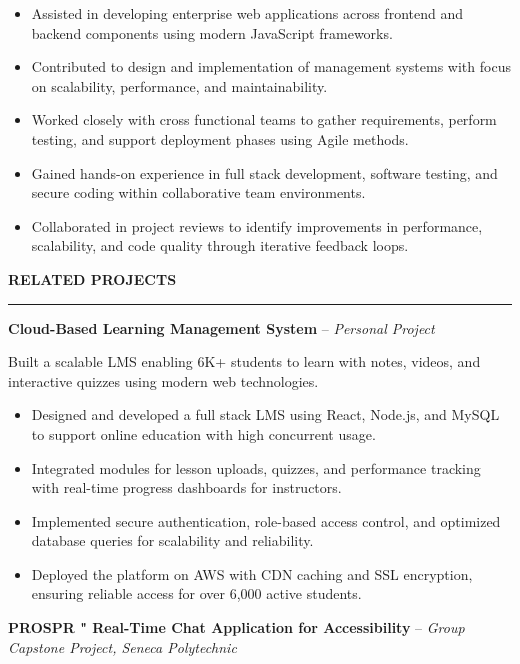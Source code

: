 \documentclass[10pt,letterpaper]{article}
\begin{document}
\begin{itemize}
\item Assisted in developing enterprise web applications across frontend and backend components using modern JavaScript frameworks.
\item Contributed to design and implementation of management systems with focus on scalability, performance, and maintainability.
\item Worked closely with cross functional teams to gather requirements, perform testing, and support deployment phases using Agile methods.
\item Gained hands-on experience in full stack development, software testing, and secure coding within collaborative team environments.
\item Collaborated in project reviews to identify improvements in performance, scalability, and code quality through iterative feedback loops.
\end{itemize}

\vspace{6pt}

\textbf{RELATED PROJECTS}\\[-8pt]
\noindent\rule{\textwidth}{1pt}

\vspace{-2pt}

\textbf{Cloud-Based Learning Management System} -- \emph{Personal Project}

\vspace{-1pt}

Built a scalable LMS enabling 6K+ students to learn with notes, videos, and interactive quizzes using modern web technologies.
\vspace{-1pt}
\begin{itemize}
\item Designed and developed a full stack LMS using React, Node.js, and MySQL to support online education with high concurrent usage.
\item Integrated modules for lesson uploads, quizzes, and performance tracking with real-time progress dashboards for instructors.
\item Implemented secure authentication, role-based access control, and optimized database queries for scalability and reliability.
\item Deployed the platform on AWS with CDN caching and SSL encryption, ensuring reliable access for over 6,000 active students.
\end{itemize}

\textbf{PROSPR " Real-Time Chat Application for Accessibility} -- \emph{Group Capstone Project, Seneca Polytechnic}
\end{document}
